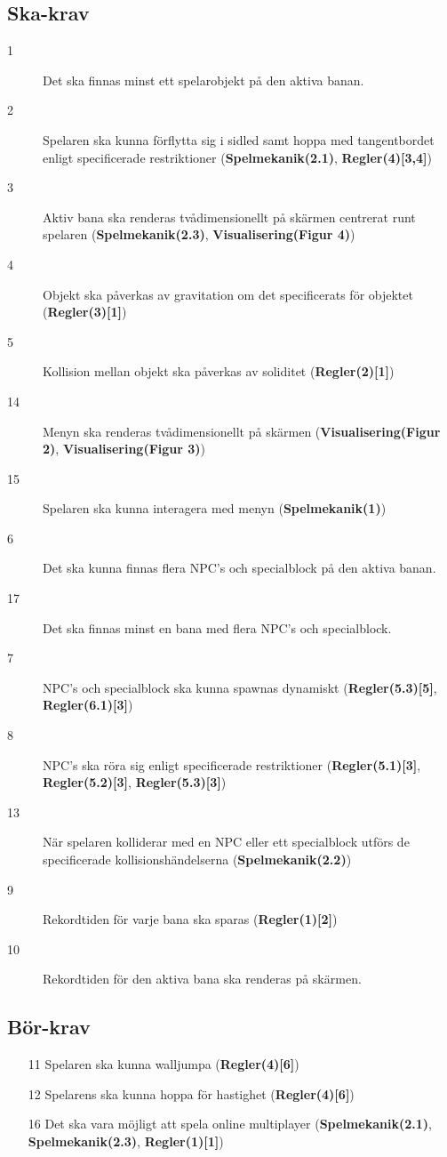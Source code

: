 \documentclass{TDP003mall}
\begin{document}
\subsection{Ska-krav}
\begin{description}
\item[1] Det ska finnas minst ett spelarobjekt på den aktiva banan.
\item[2] Spelaren ska kunna förflytta sig i sidled samt hoppa med tangentbordet enligt specificerade restriktioner (\textbf{Spelmekanik(2.1)}, \textbf{Regler(4)[3,4]})
\item[3] Aktiv bana ska renderas tvådimensionellt på skärmen centrerat runt spelaren (\textbf{Spelmekanik(2.3)}, \textbf{Visualisering(Figur 4)})
\item[4] Objekt ska påverkas av gravitation om det specificerats för objektet (\textbf{Regler(3)[1]})
\item[5] Kollision mellan objekt ska påverkas av soliditet (\textbf{Regler(2)[1]})
\item[14] Menyn ska renderas tvådimensionellt på skärmen (\textbf{Visualisering(Figur 2)}, \textbf{Visualisering(Figur 3)})
\item[15] Spelaren ska kunna interagera med menyn (\textbf{Spelmekanik(1)})
\item[6] Det ska kunna finnas flera NPC's och specialblock på den aktiva banan.
\item[17] Det ska finnas minst en bana med flera NPC's och specialblock.
\item[7] NPC's och specialblock ska kunna spawnas dynamiskt (\textbf{Regler(5.3)[5]}, \textbf{Regler(6.1)[3]})
\item[8] NPC's ska röra sig enligt specificerade restriktioner (\textbf{Regler(5.1)[3]}, \textbf{Regler(5.2)[3]}, \textbf{Regler(5.3)[3]})
\item[13] När spelaren kolliderar med en NPC eller ett specialblock utförs de specificerade kollisionshändelserna (\textbf{Spelmekanik(2.2)})
\item[9] Rekordtiden för varje bana ska sparas (\textbf{Regler(1)[2]})
\item[10] Rekordtiden för den aktiva bana ska renderas på skärmen.
\end{description}

\subsection{Bör-krav}
\begin{itemize}
\item[11] Spelaren ska kunna walljumpa (\textbf{Regler(4)[6]})
\item[12] Spelarens ska kunna hoppa för hastighet (\textbf{Regler(4)[6]})
\item[16] Det ska vara möjligt att spela online multiplayer (\textbf{Spelmekanik(2.1)}, \textbf{Spelmekanik(2.3)}, \textbf{Regler(1)[1]})
\end{itemize}
\end{document}
